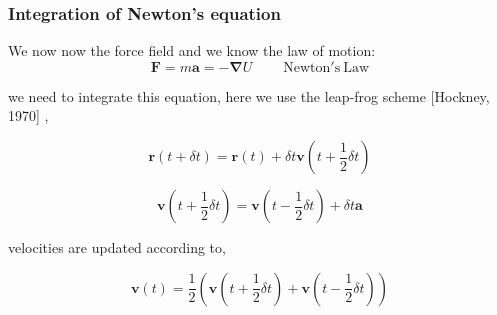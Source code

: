 \documentclass{beamer}
\begin{document}
\begin{frame}\frametitle{Integration of Newton's equation}

We now now the force field and we know the law of motion:
  \begin{equation}
	  \mathbf{F}= m \mathbf{a} = - \mathbf{\nabla} U      \mathrm{~~~~~~~~~~Newton's~ Law}
  \end{equation}

  we need to integrate this equation, here we use the leap-frog scheme [Hockney, 1970] ,

  \begin{equation}
	  \mathbf{r} (t+\delta t)= \mathbf{r} (t) + \delta t  \mathbf{v} (t+ \frac{1}{2} \delta t)
  \end{equation}

  \begin{equation}
	  \mathbf{v} (t+ \frac{1}{2}\delta t)= \mathbf{v} (t- \frac{1}{2} \delta t) + \delta t \mathbf{a}
  \end{equation}

velocities are updated according to, 

  \begin{equation}
	  \mathbf{v} (t)= \frac{1}{2} \left( \mathbf{v} (t+ \frac{1}{2} \delta t) + \mathbf{v} (t- \frac{1}{2} \delta t)  \right)
  \end{equation}

\end{frame}
\end{document}
